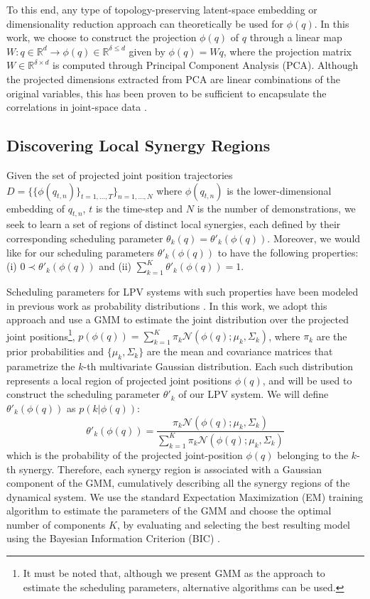 \documentclass[letterpaper, 10 pt, conference,fleqn]{ieeeconf}
\begin{document}
To this end, any type of topology-preserving latent-space embedding or dimensionality reduction approach can theoretically be used for $\phi(q)$. In this work, we choose to construct the projection $\phi(q)$ of $q$ through a linear map $W:q \in \mathbb{R}^{d} \rightarrow \phi(q) \in \mathbb{R}^{\delta\leq d}$ given by $\phi(q) = Wq$, where the projection matrix $W \in \mathbb{R}^{\delta \times d}$ is computed through Principal Component Analysis (PCA). Although the projected dimensions extracted from PCA are linear combinations of the original variables, this has been proven to be sufficient to encapsulate the correlations in joint-space data \cite{calinon2005recognition}.

\nocite{*}

\subsection{Discovering Local Synergy Regions}
Given the set of projected joint position trajectories $D=\{\{\phi(q_{t,n})\}_{t=1,\dots, T}\}_{n=1,\dots,N}$ where $\phi(q_{t,n})$ is the lower-dimensional embedding of $q_{t,n}$, $t$ is the time-step and $N$ is the number of demonstrations, we seek to learn a set of regions of distinct local synergies, each defined by their corresponding scheduling parameter $\theta_k(q) = \theta'_k(\phi(q))$. Moreover, we would like for our scheduling parameters $\theta'_k(\phi(q))$ to have the following properties: (i) $0 \prec \theta'_k(\phi(q))$ and (ii) $\sum_{k=1}^{K}\theta'_k(\phi(q)) = 1$.

Scheduling parameters for LPV systems with such properties have been modeled in previous work as probability distributions \cite{7439839, Salehian-RSS-16}. In this work, we adopt this approach and use a GMM to estimate the joint distribution over the projected joint positions\footnote{It must be noted that, although we present GMM as the approach to estimate the scheduling parameters, alternative algorithms can be used.}, $p(\phi(q)) = \sum_{k=1}^K\pi_k\mathcal{N}(\phi(q);\mu_k,\Sigma_k)$, where $\pi_k$ are the prior probabilities and $\{\mu_k,\Sigma_k\}$ are the mean and covariance matrices that parametrize the $k$-th multivariate Gaussian distribution. Each such distribution represents a local region of projected joint positions $\phi(q)$, and will be used to construct the scheduling parameter $\theta'_k$ of our LPV system. We will define $\theta'_k(\phi(q))$ as $p(k|\phi(q))$:
\begin{equation}
\label{eq:theta}
\theta'_k(\phi(q))= \frac{\pi_k\mathcal{N} (\phi(q); \mu_k, \Sigma_k)}{\sum_{k=1}^K \pi_k\mathcal{N} (\phi(q); \mu_k, \Sigma_k)}
\end{equation}
which is the probability of the projected joint-position $\phi(q)$ belonging to the $k$-th synergy. Therefore, each synergy region is associated with a Gaussian component of the GMM, cumulatively describing all the synergy regions of the dynamical system. We use the standard Expectation Maximization (EM) training algorithm to estimate the parameters of the GMM and choose the optimal number of components $K$, by evaluating and selecting the best resulting model using the Bayesian Information Criterion (BIC) \cite{Bishop:PRM:2006}.
\end{document}
